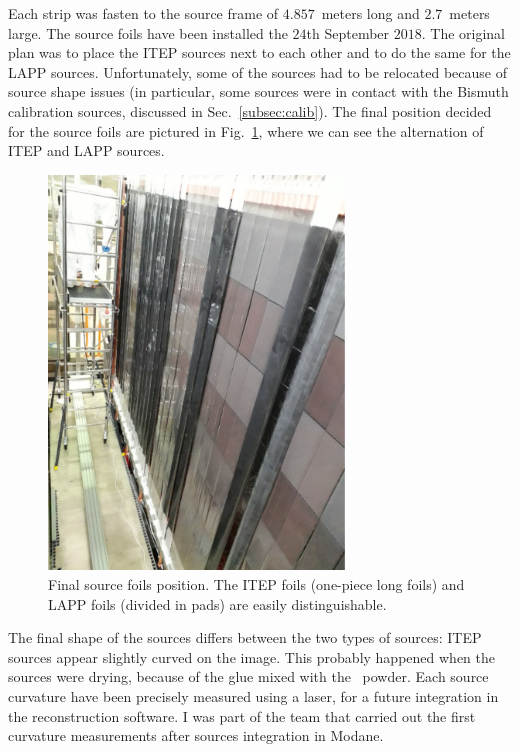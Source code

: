 Each strip was fasten to the source frame of $4.857$~meters long and $2.7$~meters large.
The source foils have been installed the $24$th September $2018$.
The original plan was to place the ITEP sources next to each other and to do the same for the LAPP sources.
Unfortunately, some of the sources had to be relocated because of source shape issues (in particular, some sources were in contact with the Bismuth calibration sources, discussed in Sec.~\ref{subsec:calib}).
The final position decided for the source foils are pictured in Fig.~\ref{fig:source_foils_installation}, where we can see the alternation of ITEP and LAPP sources.
\begin{figure}[h!]
\centering
\includegraphics[width=0.7\textwidth]{SNdemonstrator/fig_SNdemonstrator/source_foils_final_position.pdf}
\caption{Final source foils position.
  The ITEP foils (one-piece long foils) and LAPP foils (divided in pads) are easily distinguishable.
\label{fig:source_foils_installation}}
\end{figure}
The final shape of the sources differs between the two types of sources: ITEP sources appear slightly curved on the image.
This probably happened when the sources were drying, because of the glue mixed with the \Se\ powder.
Each source curvature have been precisely measured using a laser, for a future integration in the reconstruction software.
I was part of the team that carried out the first curvature measurements after sources integration in Modane.

